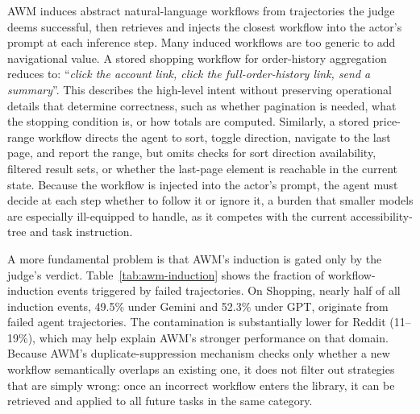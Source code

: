 AWM induces abstract natural-language workflows from trajectories the judge deems successful, then retrieves and injects the closest workflow into the actor's prompt at each inference step.
Many induced workflows are too generic to add navigational value.
A stored shopping workflow for order-history aggregation reduces to: ``\textit{click the account link, click the full-order-history link, send a summary}''.
This describes the high-level intent without preserving operational details that determine correctness, such as whether pagination is needed, what the stopping condition is, or how totals are computed.
Similarly, a stored price-range workflow directs the agent to sort, toggle direction, navigate to the last page, and report the range, but omits checks for sort direction availability, filtered result sets, or whether the last-page element is reachable in the current state.
Because the workflow is injected into the actor's prompt, the agent must decide at each step whether to follow it or ignore it, a burden that smaller models are especially ill-equipped to handle, as it competes with the current accessibility-tree and task instruction.

A more fundamental problem is that AWM's induction is gated only by the judge's verdict.
Table~\ref{tab:awm-induction} shows the fraction of workflow-induction events triggered by failed trajectories.
On Shopping, nearly half of all induction events, 49.5\% under Gemini and 52.3\% under GPT, originate from failed agent trajectories.
The contamination is substantially lower for Reddit (11--19\%), which may help explain AWM's stronger performance on that domain.
Because AWM's duplicate-suppression mechanism checks only whether a new workflow semantically overlaps an existing one, it does not filter out strategies that are simply wrong: once an incorrect workflow enters the library, it can be retrieved and applied to all future tasks in the same category.


